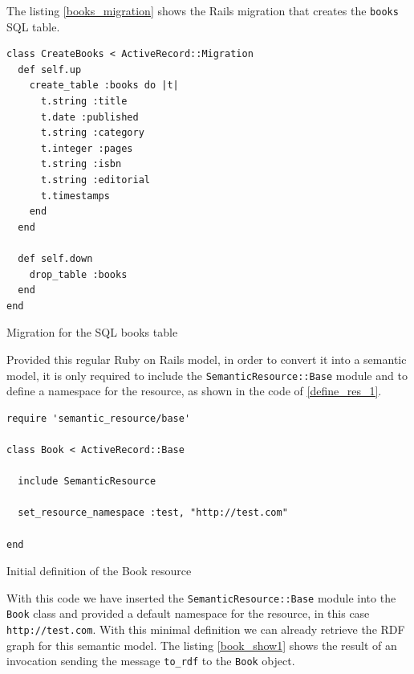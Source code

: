 The listing \ref{books_migration} shows the Rails migration that creates the \texttt{books} SQL table.

\begin{table}
\vspace{5 mm}
\begin{lstlisting}
class CreateBooks < ActiveRecord::Migration
  def self.up
    create_table :books do |t|
      t.string :title
      t.date :published
      t.string :category
      t.integer :pages
      t.string :isbn
      t.string :editorial
      t.timestamps
    end
  end

  def self.down
    drop_table :books
  end
end
\end{lstlisting} 
\vspace{5 mm}
\caption{Migration for the SQL books table}
\label{books_migration}
\end{table}

Provided this regular Ruby on Rails model, in order to convert it into a semantic model, it is only required to include
the \texttt{SemanticResource::Base} module and to define a namespace for the resource, as shown in the code of
\ref{define_res_1}.

\begin{table}
\vspace{5 mm}
\begin{lstlisting}
require 'semantic_resource/base'

class Book < ActiveRecord::Base

  include SemanticResource

  set_resource_namespace :test, "http://test.com"

end
\end{lstlisting} 
\vspace{5 mm}
\caption{Initial definition of the Book resource}
\label{define_res_1}
\end{table}

With this code we have inserted the \texttt{SemanticResource::Base} module into the \texttt{Book} class and provided a
default namespace for the resource, in this case \texttt{http://test.com}. With this minimal definition we can already
retrieve the RDF graph for this semantic model. The listing \ref{book_show1} shows the result of an invocation sending
the message \texttt{to\_rdf} to the \texttt{Book} object.

